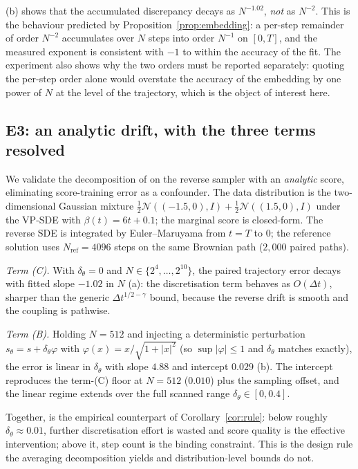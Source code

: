 \documentclass[a4paper,fleqn]{cas-dc}
\theoremstyle{definition}
\begin{document}
(b) shows that the accumulated discrepancy decays as $N^{-1.02}$,
\emph{not} as $N^{-2}$. This is the behaviour predicted by Proposition~\ref{prop:embedding}: a
per-step remainder of order $N^{-2}$ accumulates over $N$ steps into order $N^{-1}$ on
$[0,T]$, and the measured exponent is consistent with $-1$ to within the accuracy of
the fit. The experiment also shows why the two orders must be reported separately:
quoting the per-step order alone would overstate the accuracy of the embedding by one
power of $N$ at the level of the trajectory, which is the object of interest here.

\subsection{E3: an analytic drift, with the three terms resolved}
\label{sec:exp-e3}

We validate the decomposition of  on the reverse sampler with
an \emph{analytic} score, eliminating score-training error as a confounder.
The data distribution is the two-dimensional Gaussian mixture
$\tfrac12\mathcal{N}((-1.5,0),I)+\tfrac12\mathcal{N}((1.5,0),I)$ under the
VP-SDE with $\beta(t)=6t+0.1$; the marginal score is closed-form. The reverse
SDE is integrated by Euler--Maruyama from $t=T$ to $0$; the reference solution
uses $N_{\mathrm{ref}}=4096$ steps on the same Brownian path
($2{,}000$ paired paths).

\emph{Term (C).} With $\delta_{\theta}=0$ and $N\in\{2^{4},\dots,2^{10}\}$, the
paired trajectory error decays with fitted slope $-1.02$ in $N$
(a): the discretisation term behaves as $O(\Delta t)$, sharper
than the generic $\Delta t^{1/2-\gamma}$ bound, because the reverse drift is
smooth and the coupling is pathwise.

\emph{Term (B).} Holding $N=512$ and injecting a deterministic perturbation
$s_{\theta}=s+\delta_{\theta}\varphi$ with
$\varphi(x)=x/\sqrt{1+\lvert x\rvert^{2}}$ (so $\sup\lvert\varphi\rvert\le1$
and $\delta_{\theta}$ matches  exactly), the error is linear in
$\delta_{\theta}$ with slope $4.88$ and intercept $0.029$
(b). The intercept reproduces the term-(C) floor at $N=512$
($0.010$) plus the sampling offset, and the linear regime extends over the
full scanned range $\delta_{\theta}\in[0,0.4]$.

Together,  is the empirical counterpart of Corollary~\ref{cor:rule}:
below roughly $\delta_{\theta}\approx0.01$, further discretisation effort is
wasted and score quality is the effective intervention; above it, step count is the
binding constraint. This is the design rule the averaging decomposition yields
and distribution-level bounds do not.
\end{document}
